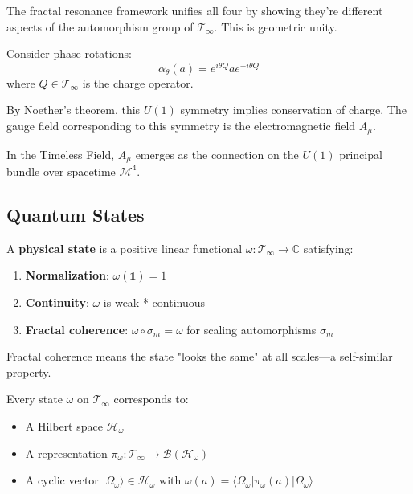 \begin{defn}
\begin{keyidea}
The fractal resonance framework unifies all four by showing they're different aspects of the automorphism group of $\mathcal{T}_\infty$. This is geometric unity.
\end{keyidea}

\begin{example}
Consider phase rotations:
\begin{equation}
\alpha_\theta(a) = e^{i\theta Q} a e^{-i\theta Q}
\end{equation}
where $Q \in \mathcal{T}_\infty$ is the charge operator.

By Noether's theorem, this $U(1)$ symmetry implies conservation of charge. The gauge field corresponding to this symmetry is the electromagnetic field $A_\mu$.

In the Timeless Field, $A_\mu$ emerges as the connection on the $U(1)$ principal bundle over spacetime $\mathcal{M}^4$.
\end{example}

\subsection{Quantum States}

\begin{defn}\label{def:physical-states}
A \textbf{physical state} is a positive linear functional $\omega: \mathcal{T}_\infty \to \mathbb{C}$ satisfying:
\begin{enumerate}
\item \textbf{Normalization}: $\omega(\mathbb{1}) = 1$
\item \textbf{Continuity}: $\omega$ is weak-* continuous
\item \textbf{Fractal coherence}: $\omega \circ \sigma_m = \omega$ for scaling automorphisms $\sigma_m$
\end{enumerate}
\end{defn}

Fractal coherence means the state "looks the same" at all scales—a self-similar property.

\begin{thm}\label{thm:gns-timeless}
Every state $\omega$ on $\mathcal{T}_\infty$ corresponds to:
\begin{itemize}
\item A Hilbert space $\mathcal{H}_\omega$
\item A representation $\pi_\omega: \mathcal{T}_\infty \to \mathcal{B}(\mathcal{H}_\omega)$
\item A cyclic vector $|\Omega_\omega\rangle \in \mathcal{H}_\omega$ with $\omega(a) = \langle \Omega_\omega | \pi_\omega(a) | \Omega_\omega \rangle$
\end{itemize}
\end{thm}


\end{defn}
